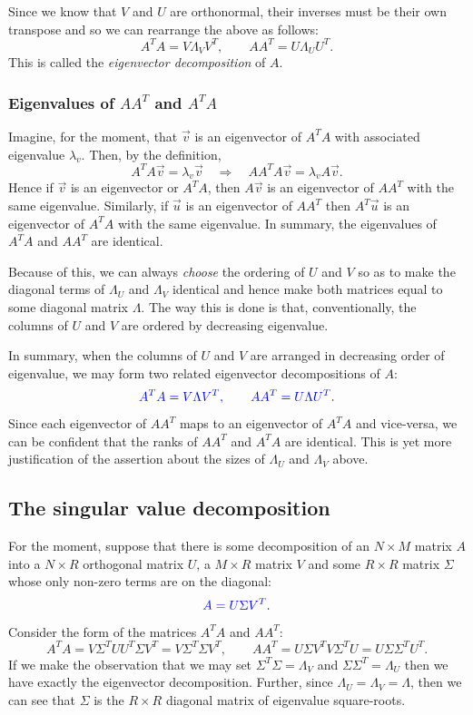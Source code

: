 \documentclass[a4paper]{article}
\newcommand{\highlight}[1]{{\color{blue}#1}}
\begin{document}
Since we know that $V$ and $U$ are orthonormal, their inverses must be their own
transpose and so we can rearrange the above as follows:
\[
  A^TA = V \Lambda_V V^T, \qquad AA^T = U \Lambda_U U^T.
\]
This is called the \emph{eigenvector decomposition} of $A$. 

\subsubsection{Eigenvalues of $AA^T$ and $A^TA$}

Imagine, for the moment, that $\vec{v}$ is an eigenvector of $A^TA$ with
associated eigenvalue $\lambda_v$.
Then, by the definition,
\[
  A^TA\vec{v} = \lambda_v \vec{v}
  \quad \Rightarrow \quad
  AA^TA\vec{v} = \lambda_v A\vec{v}.
\]
Hence if $\vec{v}$ is an eigenvector or $A^TA$, then $A\vec{v}$ is an
eigenvector of $AA^T$ with the same eigenvalue. Similarly, if $\vec{u}$ is an
eigenvector of $AA^T$ then $A^T\vec{u}$ is an eigenvector of $A^TA$ with the
same eigenvalue. In summary, \highlight{the eigenvalues of $A^TA$ and $AA^T$ are
identical}.

Because of this, we can always \emph{choose} the ordering of $U$ and $V$ so as
to make the diagonal terms of $\Lambda_U$ and $\Lambda_V$ identical and hence
make both matrices equal to some diagonal matrix $\Lambda$. The way this is done
is that, conventionally, \highlight{the columns of $U$ and $V$ are ordered by
decreasing eigenvalue}.

In summary, when the columns of $U$ and $V$ are arranged in decreasing order of
eigenvalue, we may form two related eigenvector decompositions of $A$:
\[
  \highlight{A^TA = V \Lambda V^T, \qquad AA^T = U \Lambda U^T}.
\]
Since each eigenvector of $AA^T$ maps to an eigenvector of $A^TA$ and
vice-versa, we can be confident that the ranks of $AA^T$ and $A^TA$ are
identical. This is yet more justification of the assertion about the sizes of
$\Lambda_U$ and $\Lambda_V$ above.

\subsection{The singular value decomposition}

For the moment, suppose that there is some decomposition of an $N \times M$
matrix $A$ into a $N \times R$ orthogonal matrix $U$, a $M \times R$ matrix $V$
and some $R \times R$ matrix $\Sigma$ whose only non-zero terms are on the
diagonal:
\[
  \highlight{A = U \Sigma V^T}.
\]
Consider the form of the matrices $A^TA$ and $AA^T$:
\[
  A^TA = V \Sigma^T U U^T \Sigma V^T = V \Sigma^T \Sigma V^T, \qquad
  AA^T = U \Sigma V^T V \Sigma^T U = U \Sigma \Sigma^T U^T.
\]
If we make the observation that we may set $\Sigma^T \Sigma = \Lambda_V$ and
$\Sigma \Sigma^T = \Lambda_U$ then we have exactly the eigenvector
decomposition. Further, since $\Lambda_U = \Lambda_V = \Lambda$, then we can see
that \highlight{$\Sigma$ is the $R \times R$ diagonal matrix of eigenvalue
square-roots}.
\end{document}
